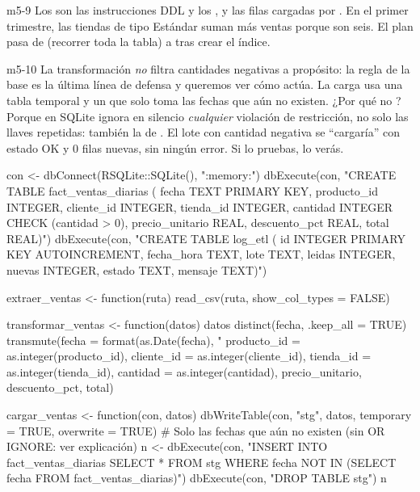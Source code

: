 \begin{solucion}{m5-9}
Los  son las instrucciones DDL y los ,
 y  las filas cargadas por .
En el primer trimestre, las tiendas de tipo Estándar suman más ventas
porque son seis. El plan pasa de  (recorrer toda la tabla) a
 tras crear el índice.
\end{solucion}

\begin{solucion}{m5-10}
La transformación \emph{no} filtra cantidades negativas a propósito: la
regla  de la base es la última línea de defensa y queremos
ver cómo actúa. La carga usa una tabla temporal y un  que
solo toma las fechas que aún no existen. ¿Por qué no ? Porque en SQLite  ignora en silencio
\emph{cualquier} violación de restricción, no solo las llaves repetidas:
también la de . El lote con cantidad negativa se
``cargaría'' con estado OK y 0 filas nuevas, sin ningún error. Si lo
pruebas, lo verás.

\begin{rcode}
con <- dbConnect(RSQLite::SQLite(), ":memory:")
dbExecute(con, "CREATE TABLE fact_ventas_diarias (
  fecha TEXT PRIMARY KEY, producto_id INTEGER, cliente_id INTEGER,
  tienda_id INTEGER, cantidad INTEGER CHECK (cantidad > 0),
  precio_unitario REAL, descuento_pct REAL, total REAL)")
dbExecute(con, "CREATE TABLE log_etl (
  id INTEGER PRIMARY KEY AUTOINCREMENT, fecha_hora TEXT, lote TEXT,
  leidas INTEGER, nuevas INTEGER, estado TEXT, mensaje TEXT)")

extraer_ventas <- function(ruta) read_csv(ruta, show_col_types = FALSE)

transformar_ventas <- function(datos) {
  datos %
    distinct(fecha, .keep_all = TRUE) %
    transmute(fecha = format(as.Date(fecha), "%
              producto_id = as.integer(producto_id),
              cliente_id = as.integer(cliente_id),
              tienda_id = as.integer(tienda_id),
              cantidad = as.integer(cantidad), precio_unitario,
              descuento_pct, total)
}

cargar_ventas <- function(con, datos) {
  dbWriteTable(con, "stg", datos, temporary = TRUE, overwrite = TRUE)
  # Solo las fechas que aún no existen (sin OR IGNORE: ver explicación)
  n <- dbExecute(con, "INSERT INTO fact_ventas_diarias
                       SELECT * FROM stg
                       WHERE fecha NOT IN (SELECT fecha
                                           FROM fact_ventas_diarias)")
  dbExecute(con, "DROP TABLE stg")
  n
}


\end{rcode}
\end{solucion}
